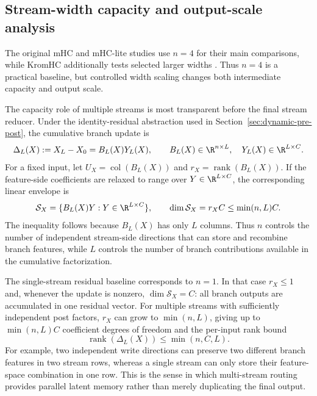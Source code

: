 \documentclass{article}
\begin{document}
\subsection{Stream-width capacity and output-scale analysis}
\label{app:stream-width-analysis}
The original mHC and mHC-lite studies use $n=4$ for their main comparisons,
while KromHC additionally tests selected larger widths
\citep{xie2026mhc,yang2026mhclite,zhou2026kromhc}. Thus $n=4$ is a practical
baseline, but controlled width scaling changes both intermediate capacity and
output scale.

The capacity role of multiple streams is most transparent before the final
stream reducer. Under the identity-residual abstraction used in
Section~\ref{sec:dynamic-pre-post}, the cumulative branch update is
\begin{equation}
 \Delta_L(X):=X_L-X_0=B_L(X)Y_L(X),
 \mspace{36mu} B_L(X)\in\R^{n\times L},\quad Y_L(X)\in\R^{L\times C}.
 \label{eq:stream-scaling-update}
\end{equation}
For a fixed input, let $U_X=\operatorname{col}(B_L(X))$ and
$r_X=\operatorname{rank}(B_L(X))$. If the feature-side coefficients are
relaxed to range over $Y\in\R^{L\times C}$, the corresponding linear envelope
is
\begin{equation}
 \mathcal S_X=\{B_L(X)Y:Y\in\R^{L\times C}\},
 \mspace{36mu} \dim\mathcal S_X=r_XC\leq\min(n,L)C.
 \label{eq:stream-scaling-space}
\end{equation}
The inequality follows because $B_L(X)$ has only $L$ columns. Thus $n$
controls the number of independent stream-side directions that can store and
recombine branch features, while $L$ controls the number of branch
contributions available in the cumulative factorization.

The single-stream residual baseline corresponds to $n=1$. In that case
$r_X\leq1$ and, whenever the update is nonzero, $\dim\mathcal S_X=C$:
all branch outputs are accumulated in one residual vector. For multiple streams
with sufficiently independent post factors, $r_X$ can grow to $\min(n,L)$,
giving up to $\min(n,L)C$ coefficient degrees of freedom and the per-input
rank bound
\begin{equation}
 \operatorname{rank}(\Delta_L(X))\leq\min(n,C,L).
 \label{eq:stream-scaling-rank}
\end{equation}
For example, two independent write directions can preserve two different branch
features in two stream rows, whereas a single stream can only store their
feature-space combination in one row. This is the sense in which multi-stream
routing provides parallel latent memory rather than merely duplicating the
final output.
\end{document}
